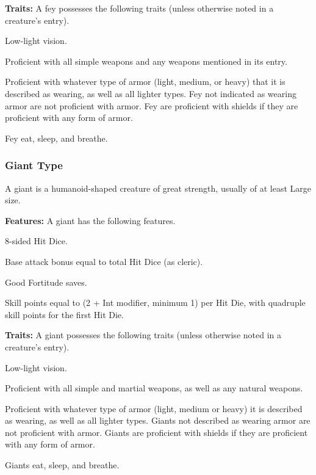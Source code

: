 \textbf{Traits:} A fey possesses the following traits (unless otherwise noted in a creature's entry).
\begin{itemize*}
\item Low-light vision.
\item Proficient with all simple weapons and any weapons mentioned in its entry.
\item Proficient with whatever type of armor (light, medium, or heavy) that it is described as wearing, as well as all lighter types. Fey not indicated as wearing armor are not proficient with armor. Fey are proficient with shields if they are proficient with any form of armor.
\item Fey eat, sleep, and breathe.
\end{itemize*}

\subsubsection{Giant Type}
A giant is a humanoid-shaped creature of great strength, usually of at least Large size.

\textbf{Features:} A giant has the following features.
\begin{itemize*}
\item 8-sided Hit Dice.
\item Base attack bonus equal to \threequarters total Hit Dice (as cleric).
\item Good Fortitude saves.
\item Skill points equal to (2 + Int modifier, minimum 1) per Hit Die, with quadruple skill points for the first Hit Die.
\end{itemize*}

\textbf{Traits:} A giant possesses the following traits (unless otherwise noted in a creature's entry).
\begin{itemize*}
\item Low-light vision.
\item Proficient with all simple and martial weapons, as well as any natural weapons.
\item Proficient with whatever type of armor (light, medium or heavy) it is described as wearing, as well as all lighter types. Giants not described as wearing armor are not proficient with armor. Giants are proficient with shields if they are proficient with any form of armor.
\item Giants eat, sleep, and breathe.
\end{itemize*}

